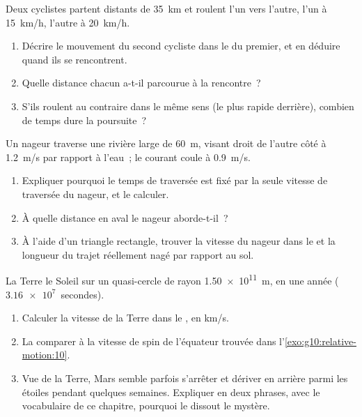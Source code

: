 \begin{exercise}[$\star\star\star$]\label{exo:g10:relative-motion:13}
Deux cyclistes partent distants de \qty{35}{km} et roulent l'un vers
l'autre, l'un à \qty{15}{km/h}, l'autre à \qty{20}{km/h}.
\begin{enumerate}
  \item Décrire le mouvement du second cycliste dans le  du
        premier, et en déduire quand ils se rencontrent.
  \item Quelle distance chacun a-t-il parcourue à la rencontre~?
  \item S'ils roulent au contraire dans le même sens (le plus rapide
        derrière), combien de temps dure la poursuite~?
\end{enumerate}
\end{exercise}

\begin{exercise}[$\star\star\star$]\label{exo:g10:relative-motion:14}
Un nageur traverse une rivière large de \qty{60}{m}, visant droit de
l'autre côté à \qty{1.2}{m/s} par rapport à l'eau~; le courant coule
à \qty{0.9}{m/s}.
\begin{enumerate}
  \item Expliquer pourquoi le temps de traversée est fixé par la seule
        vitesse de traversée du nageur, et le calculer.
  \item À quelle distance en aval le nageur aborde-t-il~?
  \item À l'aide d'un triangle rectangle, trouver la vitesse du nageur
        dans le  et la longueur du trajet
        réellement nagé par rapport au sol.
\end{enumerate}
\end{exercise}

\begin{exercise}[$\star\star\star$]\label{exo:g10:relative-motion:15}
La Terre  le Soleil sur un quasi-cercle de rayon
\qty{1.50e11}{m}, en une année ($\num{3.16e7}$~secondes).
\begin{enumerate}
  \item Calculer la vitesse de la Terre dans le
        , en \unit{km/s}.
  \item La comparer à la vitesse de spin de l'équateur trouvée dans
        l'\cref{exo:g10:relative-motion:10}.
  \item Vue de la Terre, Mars semble parfois s'arrêter et dériver en
        arrière parmi les étoiles pendant quelques semaines. Expliquer
        en deux phrases, avec le vocabulaire de ce chapitre, pourquoi
        le  dissout le mystère.
\end{enumerate}
\end{exercise}

